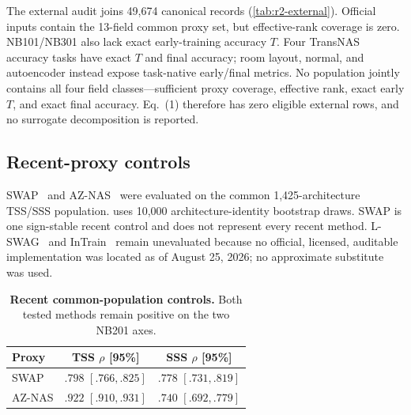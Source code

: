 The external audit joins 49,674 canonical records (\cref{tab:r2-external}).
Official inputs contain the 13-field common proxy set, but effective-rank
coverage is zero. NB101/NB301 also lack exact early-training accuracy $T$.
Four TransNAS accuracy tasks have exact $T$ and final accuracy;
room layout, normal, and autoencoder instead expose task-native early/final
metrics. No population jointly contains all four field classes---sufficient proxy
coverage, effective rank, exact early $T$, and exact final accuracy. Eq.~(1)
therefore has zero eligible
external rows, and no surrogate decomposition is reported.

\begin{table}[t]
\centering\small\setlength{\tabcolsep}{5pt}
\caption{\textbf{External field-coverage audit.} Joined rows do not imply
eligibility for the full decomposition.}
\label{tab:r2-external}
\end{table}

\subsection{Recent-proxy controls}
\label{app:r2-recent}

SWAP~\cite{peng2024swap} and AZ-NAS~\cite{aznas2024} were evaluated on the common 1,425-architecture TSS/SSS
population.  uses 10,000 architecture-identity bootstrap
draws. SWAP is one sign-stable recent control and does not represent every recent
method. L-SWAG~\cite{casarin2025lswag} and InTrain~\cite{intrain2026} remain unevaluated because no official, licensed,
auditable implementation was located as of August 25, 2026; no approximate
substitute was used.

\begin{table}[t]
\centering\small\setlength{\tabcolsep}{6pt}
\begin{tabular}{lcc}
\toprule
Proxy & TSS $\rho$ [95\%] & SSS $\rho$ [95\%]\\
\midrule
SWAP & $.798$ $[.766,.825]$ & $.778$ $[.731,.819]$\\
AZ-NAS & $.922$ $[.910,.931]$ & $.740$ $[.692,.779]$\\
\bottomrule
\end{tabular}
\caption{\textbf{Recent common-population controls.} Both tested methods remain
positive on the two NB201 axes.}
\label{tab:r2-recent}
\end{table}
